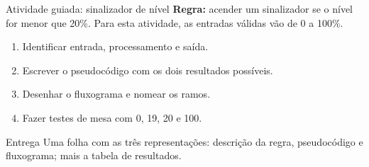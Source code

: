 \begin{frame}[t]{Atividade guiada: sinalizador de nível}
\textbf{Regra:} acender um sinalizador se o nível for menor que 20\%. Para esta atividade, as entradas válidas vão de 0 a 100\%.
\begin{enumerate}
\item Identificar entrada, processamento e saída.
\item Escrever o pseudocódigo com os dois resultados possíveis.
\item Desenhar o fluxograma e nomear os ramos.
\item Fazer testes de mesa com 0, 19, 20 e 100.
\end{enumerate}
\begin{block}{Entrega}
Uma folha com as três representações: descrição da regra, pseudocódigo e fluxograma; mais a tabela de resultados.
\end{block}
\end{frame}
